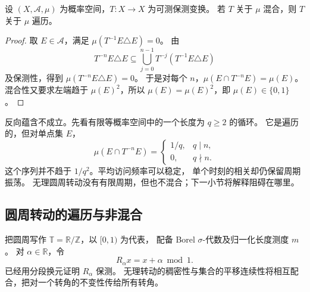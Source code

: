 \begin{proposition}[混合蕴含遍历]
\label{b1:prop:mixing-ergodic-32}
设 \((X,\mathcal A,\mu)\) 为概率空间，\(T:X\to X\) 为可测保测变换。
若 \(T\) 关于 \(\mu\) 混合，则 \(T\) 关于 \(\mu\) 遍历。
\end{proposition}
\begin{proof}
取 \(E\in\mathcal A\)，满足 \(\mu(T^{-1}E\triangle E)=0\)。
由
\[
 T^{-n}E\triangle E
 \subseteq\bigcup_{j=0}^{n-1}T^{-j}(T^{-1}E\triangle E)
\]
及保测性，得到 \(\mu(T^{-n}E\triangle E)=0\)。
于是对每个 \(n\)，\(\mu(E\cap T^{-n}E)=\mu(E)\)。
混合性又要求左端趋于 \(\mu(E)^2\)，所以
\(\mu(E)=\mu(E)^2\)，即 \(\mu(E)\in\{0,1\}\)。
\end{proof}

反向蕴含不成立。先看有限等概率空间中的一个长度为 \(q\geq2\) 的循环。
它是遍历的，但对单点集 \(E\)，
\[
 \mu(E\cap T^{-n}E)=
 \begin{cases}
  1/q,&q\mid n,\\
  0,&q\nmid n.
 \end{cases}
\]
这个序列并不趋于 \(1/q^2\)。平均访问频率可以稳定，
单个时刻的相关却仍保留周期振荡。
无理圆周转动没有有限周期，但也不混合；下一小节将解释阻碍在哪里。

\subsection{圆周转动的遍历与非混合}
\label{b1:subsec:320503}

把圆周写作 \(\mathbb T=\mathbb R/\mathbb Z\)，以 \([0,1)\) 为代表，
配备 Borel \(\sigma\)-代数及归一化长度测度 \(m\)。
对 \(\alpha\in\mathbb R\)，令
\[
 R_\alpha x=x+\alpha\bmod1.
\]
已经用分段换元证明 \(R_\alpha\) 保测。
无理转动的稠密性与集合的平移连续性将相互配合，把对一个转角的不变性传给所有转角。

